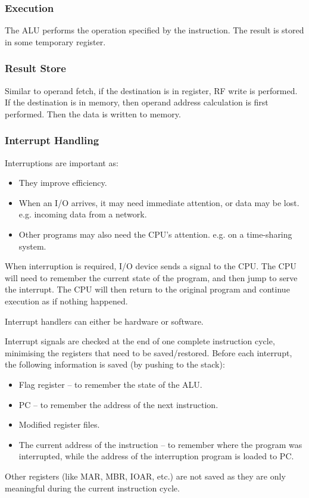\subsubsection{Execution}

The ALU performs the operation specified by the instruction. The result is stored in
some temporary register.

\subsubsection{Result Store}

Similar to operand fetch, if the destination is in register, RF write is performed.
If the destination is in memory, then operand address calculation is first performed.
Then the data is written to memory.

\subsubsection{Interrupt Handling}

Interruptions are important as:
\begin{itemize}
    \item They improve efficiency.
    \item When an I/O arrives, it may need immediate attention, or data may be lost.
        e.g. incoming data from a network.
    \item Other programs may also need the CPU's attention. e.g. on a time-sharing system.
\end{itemize}

When interruption is required, I/O device sends a signal to the CPU. The CPU will need to
remember the current state of the program, and then jump to serve the interrupt. The CPU
will then return to the original program and continue execution as if nothing happened.

Interrupt handlers can either be hardware or software.

Interrupt signals are checked at the end of one complete instruction cycle, minimising the
registers that need to be saved/restored. Before each interrupt, the following information
is saved (by pushing to the stack):
\begin{itemize}
    \item Flag register -- to remember the state of the ALU.
    \item PC -- to remember the address of the next instruction.
    \item Modified register files.
    \item The current address of the instruction -- to remember where the program was
        interrupted, while the address of the interruption program is loaded to PC.
\end{itemize}
Other registers (like MAR, MBR, IOAR, etc.) are not saved as they are only meaningful
during the current instruction cycle.